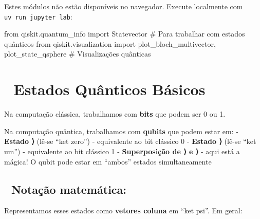 \documentclass[
  brazilian,
]{report}
\newenvironment{Shaded}{\begin{snugshade}}{\end{snugshade}}
\newcommand{\CommentTok}[1]{\textcolor[rgb]{0.37,0.37,0.37}{#1}}
\newcommand{\ImportTok}[1]{\textcolor[rgb]{0.00,0.46,0.62}{#1}}
\newcommand{\NormalTok}[1]{\textcolor[rgb]{0.00,0.23,0.31}{#1}}
\begin{document}
\begin{tcolorbox}[enhanced jigsaw, arc=.35mm, bottomrule=.15mm, bottomtitle=1mm, breakable, colback=white, colbacktitle=quarto-callout-note-color!10!white, colframe=quarto-callout-note-color-frame, coltitle=black, left=2mm, leftrule=.75mm, opacityback=0, opacitybacktitle=0.6, rightrule=.15mm, title=\textcolor{quarto-callout-note-color}{\faInfo}\hspace{0.5em}{🔒 Imports do Qiskit (requerem execução local)}, titlerule=0mm, toprule=.15mm, toptitle=1mm]

Estes módulos não estão disponíveis no navegador. Execute localmente com
\texttt{uv\ run\ jupyter\ lab}:

\begin{Shaded}
\begin{Highlighting}[]
\ImportTok{from}\NormalTok{ qiskit.quantum\_info }\ImportTok{import}\NormalTok{ Statevector  }\CommentTok{\# Para trabalhar com estados quânticos}
\ImportTok{from}\NormalTok{ qiskit.visualization }\ImportTok{import}\NormalTok{ plot\_bloch\_multivector, plot\_state\_qsphere  }\CommentTok{\# Visualizações quânticas}
\end{Highlighting}
\end{Shaded}

\end{tcolorbox}

\section{🔬 Estados Quânticos
Básicos}\label{estados-quuxe2nticos-buxe1sicos}

Na computação clássica, trabalhamos com \textbf{bits} que podem ser 0 ou
1.

Na computação quântica, trabalhamos com \textbf{qubits} que podem estar
em: - \textbf{Estado ⟩} (lê-se ``ket zero'') - equivalente ao
bit clássico 0 - \textbf{Estado ⟩} (lê-se ``ket um'') -
equivalente ao bit clássico 1 - \textbf{Superposição de ⟩ e
⟩} - aqui está a mágica! O qubit pode estar em ``ambos''
estados simultaneamente

\subsection{📌 Notação matemática:}\label{notauxe7uxe3o-matemuxe1tica}

Representamos esses estados como \textbf{vetores coluna} em ``ket psi''.
Em geral:
\end{document}
